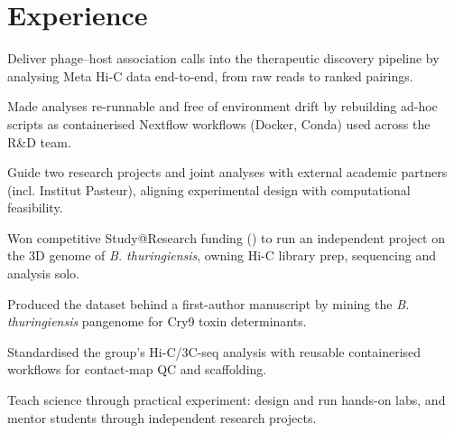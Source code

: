 \documentclass[]{deedy-resume-openfont}
\begin{document}
\begin{minipage}[t]{0.66\textwidth}


\section{Experience}

\descript{| \RolePhagos}
\location{\WhenPhagos}
\begin{tightemize}
\item Deliver phage--host association calls into the therapeutic discovery pipeline by analysing Meta Hi-C data end-to-end, from raw reads to ranked pairings.
\item Made analyses re-runnable and free of environment drift by rebuilding ad-hoc scripts as containerised Nextflow workflows (Docker, Conda) used across the R\&D team.
\item Guide two research projects and joint analyses with external academic partners (incl. Institut Pasteur), aligning experimental design with computational feasibility.
\end{tightemize}
\sectionsep

\begin{tightemize}
\item Won competitive Study@Research funding (\GrantStudyAtResearch{}) to run an independent project on the 3D genome of \textit{B. thuringiensis}, owning Hi-C library prep, sequencing and analysis solo.
\item Produced the dataset behind a first-author manuscript by mining the \textit{B. thuringiensis} pangenome for Cry9 toxin determinants.
\item Standardised the group's Hi-C/3C-seq analysis with reusable containerised workflows for contact-map QC and scaffolding.
\end{tightemize}
\sectionsep

\descript{| \RoleDanube}
\location{\WhenDanube}
\begin{tightemize}
\item Teach science through practical experiment: design and run hands-on labs, and mentor students through independent research projects.
\end{tightemize}
\sectionsep


\end{minipage}
\end{document}
